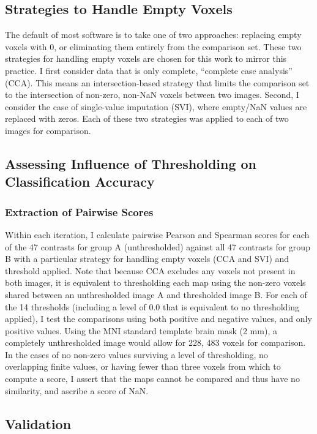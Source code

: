 \documentclass{report}
\begin{document}
\subsection{Strategies to Handle Empty Voxels}

The default of most software is to take one of two approaches: replacing
empty voxels with 0, or eliminating them entirely from the comparison
set. These two strategies for handling empty voxels are chosen for this
work to mirror this practice. I first consider data that is only
complete, ``complete case analysis'' (CCA). This means an
intersection-based strategy that limits the comparison set to the
intersection of non-zero, non-NaN voxels between two images. Second, I
consider the case of single-value imputation (SVI), where empty/NaN
values are replaced with zeros. Each of these two strategies was applied
to each of two images for comparison.

\subsection{Assessing Influence of Thresholding on Classification Accuracy}

\subsubsection{Extraction of Pairwise Scores}

Within each iteration, I calculate pairwise Pearson and Spearman scores
for each of the 47 contrasts for group A (unthresholded) against all 47
contrasts for group B with a particular strategy for handling empty
voxels (CCA and SVI) and threshold applied. Note that because CCA
excludes any voxels not present in both images, it is equivalent to
thresholding each map using the non-zero voxels shared between an
unthresholded image A and thresholded image B. For each of the 14
thresholds (including a level of 0.0 that is equivalent to no
thresholding applied), I test the comparisons using both positive and
negative values, and only positive values. Using the MNI standard
template brain mask (2 mm), a completely unthresholded image would allow
for 228, 483 voxels for comparison. In the cases of no non-zero values
surviving a level of thresholding, no overlapping finite values, or
having fewer than three voxels from which to compute a score, I assert
that the maps cannot be compared and thus have no similarity, and
ascribe a score of NaN.

\subsection{Validation}
\end{document}
